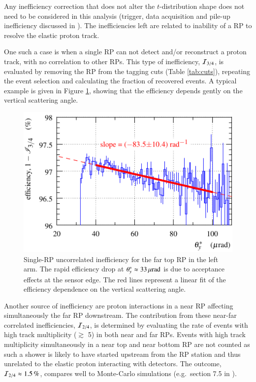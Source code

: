 Any inefficiency correction that does not alter the $t$-distribution shape does not need to be considered in this analysis (trigger, data acquisition and pile-up inefficiency discussed in \cite{epl101-el,prl111}). The inefficiencies left are related to inability of a RP to resolve the elastic proton track.

One such a case is when a single RP can not detect and/or reconstruct a proton track, with no correlation to other RPs. This type of inefficiency, ${\cal I}_{3/4}$, is evaluated by removing the RP from the tagging cuts (Table \ref{tab:cuts}), repeating the event selection and calculating the fraction of recovered events. A typical example is given in Figure \ref{fig:eff 3/4}, showing that the efficiency depends gently on the vertical scattering angle. 

\begin{figure}
\begin{center}
\includegraphics{fig/eff3outof4_details_fits.pdf}
\vskip-3mm
\caption{%
Single-RP uncorrelated inefficiency for the far top RP in the left arm. The rapid efficiency drop at $\theta_y^* \approx 33\,{\rm \mu rad}$ is due to acceptance effects at the sensor edge. The red lines represent a linear fit of the efficiency dependence on the vertical scattering angle.
}
\label{fig:eff 3/4}
\end{center}
\end{figure}

Another source of inefficiency are proton interactions in a near RP affecting simultaneously the far RP downstream. The contribution from these near-far correlated inefficiencies, ${\cal I}_{2/4}$, is determined by evaluating the rate of events with high track multiplicity ($\gtrsim$ 5) in both near and far RPs. Events with high track multiplicity simultaneously in a near top and near bottom RP are not counted as such a shower is likely to have started upstream from the RP station and thus unrelated to the elastic proton interacting with detectors. The outcome, ${\cal I}_{2/4} \approx 1.5\,{\rm \%}$, compares well to Monte-Carlo simulations (e.g.~section 7.5 in \cite{hubert-thesis}).


